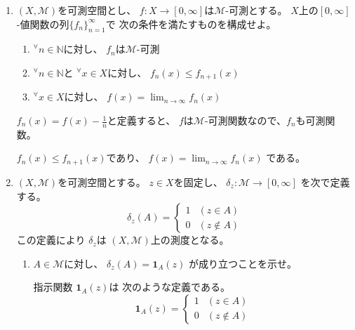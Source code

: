 \documentclass[12pt,b5paper]{ltjsarticle}
\begin{document}
\hrulefill

\begin{enumerate}
 \item
      $(X,\mathcal{M})$を可測空間とし、
      $f:X\to [0,\infty]$は$\mathcal{M}$-可測とする。
      $X$上の$[0,\infty]$-値関数の列$\{ f_{n} \}_{n=1}^{\infty}$で
      次の条件を満たすものを構成せよ。
      \begin{enumerate}
       \item
            ${}^{\forall}n\in\mathbb{N}$に対し、
            $f_{n}$は$\mathcal{M}$-可測
       \item
            ${}^{\forall}n\in\mathbb{N}$と
            ${}^{\forall}x\in X$に対し、
            $f_{n}(x)\leq f_{n+1}(x)$
       \item
            ${}^{\forall}x\in X$に対し、
            $f(x)= \lim_{n\to\infty} f_{n}(x)$
      \end{enumerate}

      \dotfill

      $f_{n}(x) = f(x)-\frac{1}{n}$と定義すると、
      $f$は$\mathcal{M}$-可測関数なので、$f_{n}$も可測関数。

      $f_{n}(x) \leq f_{n+1}(x)$であり、
      $f(x) = \lim_{n\to\infty}f_{n}(x)$
      である。

      \hrulefill
 \item
      $(X,\mathcal{M})$を可測空間とする。
      $z\in X$を固定し、
      $\delta_{z}:\mathcal{M}\to [0,\infty]$
      を次で定義する。
      \begin{equation}
       \delta_{z}(A)=
        \begin{cases}
         1 & (z\in A)\\
         0 & (z\not\in A)
        \end{cases}
      \end{equation}
      この定義により
      $\delta_{z}$は
      $(X,\mathcal{M})$上の測度となる。

      \begin{enumerate}
       \item
            $A\in\mathcal{M}$に対し、
            $\delta_{z}(A) = \mathbf{1}_{A}(z)$
            が成り立つことを示せ。

            \dotfill

            指示関数
            $\mathbf{1}_{A}(z)$は
            次のような定義である。
             \begin{equation}
              \mathbf{1}_{A}(z)=
                \begin{cases}
                 1 & (z\in A)\\
                 0 & (z\not\in A)
                \end{cases}
             \end{equation}


\end{enumerate}
\end{enumerate}
\end{document}
